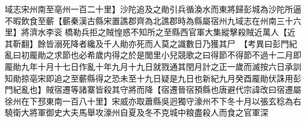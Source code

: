 域志宋州南至亳州一百二十里】沙陀追及之勛引兵循渙水而東將歸彭城為沙陀所逼不暇飲食至蘄【蘄秦漢古縣宋置譙郡齊為北譙郡時為縣屬宿州九域志在州南三十六里】將濟水李衮橋勒兵拒之賊惶惑不知所之至縣西官軍大集縱擊殺賊近萬人【近其靳翻】餘皆溺死降者纔及千人勛亦死而人莫之識數日乃獲其尸　【考異曰彭門紀亂曰初龎勛之求節也必希歲内得之於是閭里小兒競歌之曰得節不得節不過十二月即龎勛九年十月十七日作亂十年九月十九日就戮通其閏月計之正一歲而滅按六日承訓知勛掠亳宋即追之至蘄縣得之恐未至十九日疑是九日也新紀九月癸酉龎勛伏誅用彭門紀亂也】賊宿遷等諸寨皆殺其守將而降【宿遷晉宿預縣也唐避代宗諱改曰宿遷屬徐州在下邳東南一百八十里】宋威亦取蕭縣吳迥獨守濠州不下冬十月以張玄稔為右驍衛大將軍御史大夫馬舉攻濠州自夏及冬不克城中粮盡殺人而食之官軍深